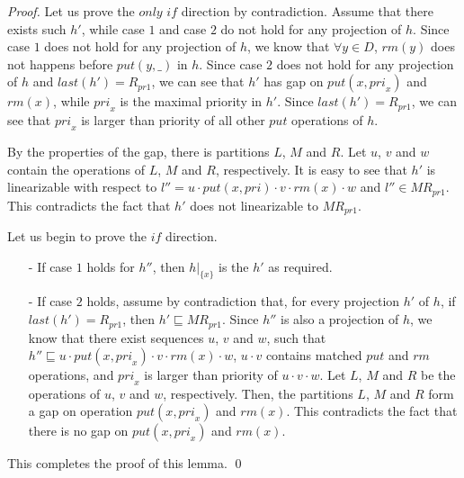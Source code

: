 \begin {proof}

Let us prove the $\textit{only if}$ direction by contradiction. Assume that there exists such $h'$, while case $1$ and case $2$ do not hold for any projection of $h$. Since case $1$ does not hold for any projection of $h$, we know that $\forall y \in D$, $\textit{rm}(y)$ does not happens before $\textit{put}(y,\_)$ in $h$. Since case $2$ does not hold for any projection of $h$ and $\textit{last}(h') = R_{\textit{pr1}}$, we can see that $h'$ has gap on $\textit{put}(x,\textit{pri}_x)$ and $\textit{rm}(x)$, while $\textit{pri}_x$ is the maximal priority in $h'$. Since $\textit{last}(h') = R_{\textit{pr1}}$, we can see that $\textit{pri}_x$ is larger than priority of all other $\textit{put}$ operations of $h$.

By the properties of the gap, there is partitions $L$, $M$ and $R$. Let $u$, $v$ and $w$ contain the operations of $L$, $M$ and $R$, respectively. It is easy to see that $h'$ is linearizable with respect to $l''=u \cdot \textit{put}(x,\textit{pri}) \cdot v \cdot \textit{rm}(x) \cdot w$ and $l'' \in \textit{MR}_{\textit{pr1}}$. This contradicts the fact that $h'$ does not linearizable to $\textit{MR}_{\textit{pr1}}$.

Let us begin to prove the $\textit{if}$ direction.

\begin{itemize}
\setlength{\itemsep}{0.5pt}
\item[-] If case $1$ holds for $h''$, then $h \vert_{ \{ x \} }$ is the $h'$ as required.

\item[-] If case $2$ holds, assume by contradiction that, for every projection $h'$ of $h$, if $\textit{last}(h') = R_{\textit{pr1}}$, then $h' \sqsubseteq \textit{MR}_{\textit{pr1}}$. Since $h''$ is also a projection of $h$, we know that there exist sequences $u$, $v$ and $w$, such that $h'' \sqsubseteq u \cdot \textit{put}(x,\textit{pri}_x) \cdot v \cdot \textit{rm}(x) \cdot w$, $u \cdot v$ contains matched $\textit{put}$ and $\textit{rm}$ operations, and $\textit{pri}_x$ is larger than priority of $u \cdot v \cdot w$. Let $L$, $M$ and $R$ be the operations of $u$, $v$ and $w$, respectively. Then, the partitions $L$, $M$ and $R$ form a gap on operation $\textit{put}(x,\textit{pri}_x)$ and $\textit{rm}(x)$. This contradicts the fact that there is no gap on $\textit{put}(x,\textit{pri}_x)$ and $\textit{rm}(x)$.
\end{itemize}

This completes the proof of this lemma. \qed
\end {proof}

